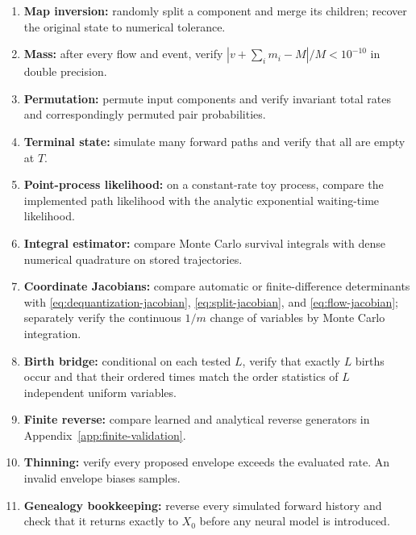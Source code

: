 \documentclass[10pt]{article}
\theoremstyle{definition}
\theoremstyle{remark}
\begin{document}
\begin{enumerate}
  \item \textbf{Map inversion:} randomly split a component and merge its children; recover the original state to numerical tolerance.
  \item \textbf{Mass:} after every flow and event, verify
  $|v+\sum_i m_i-M|/M<10^{-10}$ in double precision.
  \item \textbf{Permutation:} permute input components and verify invariant total rates and correspondingly permuted pair probabilities.
  \item \textbf{Terminal state:} simulate many forward paths and verify that all are empty at $T$.
  \item \textbf{Point-process likelihood:} on a constant-rate toy process, compare the implemented path likelihood with the analytic exponential waiting-time likelihood.
  \item \textbf{Integral estimator:} compare Monte Carlo survival integrals with dense numerical quadrature on stored trajectories.
  \item \textbf{Coordinate Jacobians:} compare automatic or finite-difference
  determinants with \eqref{eq:dequantization-jacobian},
  \eqref{eq:split-jacobian}, and \eqref{eq:flow-jacobian}; separately verify
  the continuous $1/m$ change of variables by Monte Carlo integration.
  \item \textbf{Birth bridge:} conditional on each tested $L$, verify that
  exactly $L$ births occur and that their ordered times match the order
  statistics of $L$ independent uniform variables.
  \item \textbf{Finite reverse:} compare learned and analytical reverse generators in Appendix~\ref{app:finite-validation}.
  \item \textbf{Thinning:} verify every proposed envelope exceeds the evaluated rate.  An invalid envelope biases samples.
  \item \textbf{Genealogy bookkeeping:} reverse every simulated forward history and check that it returns exactly to $X_0$ before any neural model is introduced.
\end{enumerate}
\end{document}
